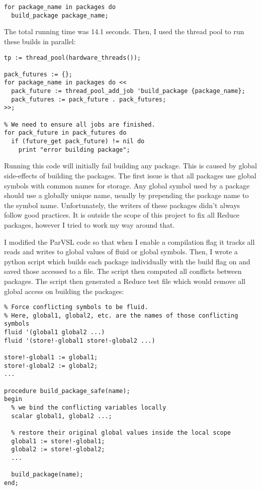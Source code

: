 \begin{verbatim}
for package_name in packages do
  build_package package_name;
\end{verbatim}

The total running time was 14.1 seconds. Then, I used the thread pool
to run these builds in parallel:

\begin{verbatim}
tp := thread_pool(hardware_threads());

pack_futures := {};
for package_name in packages do <<
  pack_future := thread_pool_add_job 'build_package {package_name};
  pack_futures := pack_future . pack_futures;
>>;

% We need to ensure all jobs are finished.
for pack_future in pack_futures do
  if (future_get pack_future) != nil do
    print "error building package";
\end{verbatim}

Running this code will initially fail building any package. This is caused
by global side-effects of building the packages. The first issue is that all
packages use global symbols with common names for storage. Any global
symbol used by a package should use a globally unique name, usually by prepending
the package name to the symbol name. Unfortunately, the writers of these packages
didn't always follow good practices. It is outside the scope of this project to
fix all Reduce packages, however I tried to work my way around that.

I modified the ParVSL code so that when I enable a compilation flag it tracks all
reads and writes to global values of fluid or global symbols. Then, I wrote a python
script which builds each package individually with the build flag on and saved those
accessed to a file. The script then computed all conflicts between packages. The script
then generated a Reduce test file which would remove all global access on building the packages:

\begin{verbatim}
% Force conflicting symbols to be fluid.
% Here, global1, global2, etc. are the names of those conflicting symbols
fluid '(global1 global2 ...)
fluid '(store!-global1 store!-global2 ...)

store!-global1 := global1;
store!-global2 := global2;
...

procedure build_package_safe(name);
begin
  % we bind the conflicting variables locally
  scalar global1, global2 ...;

  % restore their original global values inside the local scope
  global1 := store!-global1;
  global2 := store!-global2;
  ...

  build_package(name);
end;
\end{verbatim}

